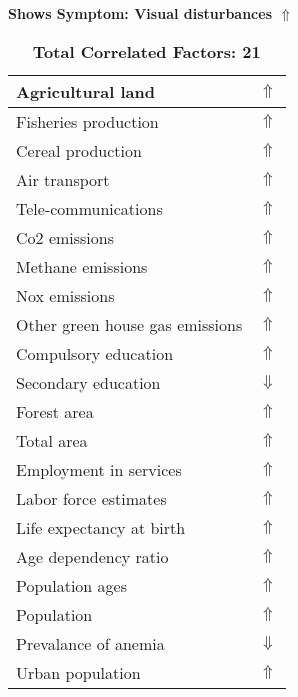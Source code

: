 \documentclass[12pt,notitlepage,oneside]{report}
\begin{document}
\clearpage
\begin{table}[!htb]
\caption{\textbf{Shows Symptom: Visual disturbances $\Uparrow$}}
\centering
\label{Correlated Socio-economic Factors0}
\begin{tabular}{|l|l|}
\hline
Agricultural land & $\Uparrow$\\ \hline
Fisheries production & $\Uparrow$\\ \hline
Cereal production & $\Uparrow$\\ \hline
Air transport  & $\Uparrow$\\ \hline
Tele-communications & $\Uparrow$\\ \hline
Co2 emissions & $\Uparrow$\\ \hline
Methane emissions & $\Uparrow$\\ \hline
Nox emissions & $\Uparrow$\\ \hline
Other green house gas emissions & $\Uparrow$\\ \hline
Compulsory education & $\Uparrow$\\ \hline
Secondary education & $\Downarrow$\\ \hline
Forest area & $\Uparrow$\\ \hline
Total area & $\Uparrow$\\ \hline
Employment in services & $\Uparrow$\\ \hline
Labor force estimates & $\Uparrow$\\ \hline
Life expectancy at birth & $\Uparrow$\\ \hline
Age dependency ratio & $\Uparrow$\\ \hline
Population ages & $\Uparrow$\\ \hline
Population & $\Uparrow$\\ \hline
Prevalance of anemia & $\Downarrow$\\ \hline
Urban population & $\Uparrow$\\ \hline
\end{tabular}
\caption*{\textbf{Total Correlated Factors: 21}}
\end{table}
\end{document}
